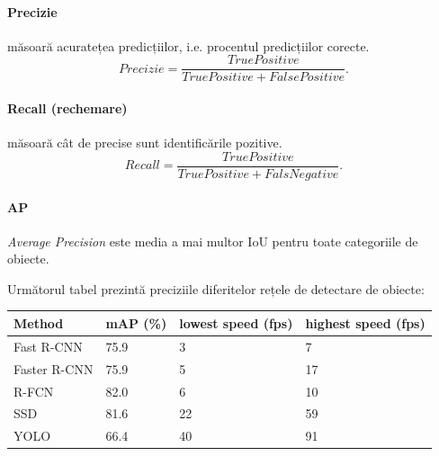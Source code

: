 \paragraph{Precizie} măsoară acuratețea predicțiilor, i.e. procentul predicțiilor corecte.
\begin{equation}
Precizie = \frac{TruePositive}{TruePositive + FalsePositive}.
\end{equation}

\paragraph{Recall (rechemare)} măsoară cât de precise sunt identificările pozitive.
\begin{equation}
Recall = \frac{TruePositive}{TruePositive + FalsNegative}.
\end{equation}

\paragraph{AP} \textit{Average Precision} este media a mai multor IoU pentru toate categoriile de obiecte.

Următorul tabel prezintă preciziile diferitelor rețele de detectare de obiecte:

\begin{center}
    \begin{tabular}{| l | l | l | l |}
    \hline
    Method & mAP (\%) & lowest speed (fps) & highest speed (fps)\\ \hline
    Fast R-CNN & 75.9 & 3 & 7  \\ \hline
    Faster R-CNN & 75.9 & 5 & 17 \\ \hline
    R-FCN & 82.0 & 6 & 10  \\ \hline
    SSD & 81.6 &22 & 59 \\  \hline
    YOLO & 66.4 & 40 & 91 \\  \hline
    \end{tabular}
\end{center}

